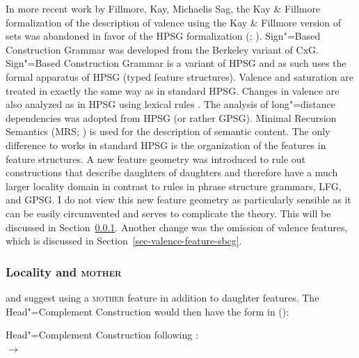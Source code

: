 In more recent work by Fillmore, Kay, Michaelis \biband Sag, the Kay \& Fillmore formalization of the
description of valence using the Kay \& Fillmore version of sets was abandoned in favor of the HPSG formalization
(\citealp{Kay2005a,Michaelis2006a,Sag2012a}; \citealp*[--11]{SBK2012a}).
Sign"=Based Construction Grammar was developed from the Berkeley variant of CxG.
Sign"=Based Construction Grammar is a variant of HPSG \citep[]{Sag2010b} and as such uses the formal apparatus of HPSG (typed feature structures).
Valence and saturation are treated in exactly the same way as in standard HPSG. Changes
in valence are also analyzed as in HPSG using lexical rules \citep*[Section~2.3]{SBK2012a}.
The analysis of long"=distance dependencies was adopted from HPSG (or
rather GPSG\indexgpsg).
Minimal Recursion Semantics (MRS\indexmrs; \citealp*{CFPS2005a}) is used for the description of semantic content.
The only difference to works in standard HPSG is the organization of the features in feature structures.
A new feature geometry was introduced to rule out constructions that describe daughters of
daughters and therefore have a much larger locality domain in contrast to rules in
phrase structure grammars, LFG, and GPSG. I do not view this new feature geometry as particularly
sensible as it can be easily circumvented and serves to complicate the theory. This will be
discussed in Section~\ref{sec-mother}. Another change was the omission of valence features, which is discussed in Section~\ref{sec-valence-feature-sbcg}.

\subsubsection{Locality and \textsc{mother}}
\label{sec-mother}

\mbox{}\citet*[475--489]{SWB2003a} and \citet{Sag2007a,Sag2012a} suggest using a \textsc{mother} feature in addition to
daughter features. The Head"=Complement Construction would then have the form in ():

\eas
Head"=Complement Construction following \citet*[481]{SWB2003a}:\\
 $\to$\\
\zs

